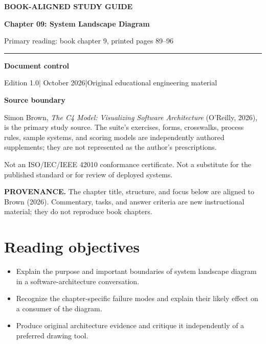 \documentclass[10pt,letterpaper]{article}
\newcommand{\SourceNote}[1]{\par\smallskip\noindent\colorbox{C4Light}{\parbox{0.94\linewidth}{\footnotesize\textbf{PROVENANCE.} #1}}\par\medskip}
\newcommand{\DocStart}[3]{%
\begin{document}
\begin{titlepage}
\renewcommand{\thepage}{title-\arabic{page}}
\vspace*{0.55in}
{\sffamily\bfseries\small\color{C4Teal}#1}\par\vspace{0.24in}
{\sffamily\bfseries\fontsize{26}{31}\selectfont\color{C4Navy}#2}\par\vspace{0.18in}
{\large\color{C4Gray}#3}\par\vspace{0.4in}
\textcolor{C4Teal}{\rule{\linewidth}{1.15pt}}\par\vspace{0.24in}
\textbf{Document control}\par
Edition 1.0\quad|\quad 30 October 2026\quad|\quad Original educational engineering material\par
\vspace{0.17in}
\textbf{Source boundary}\par
Simon Brown, \emph{The C4 Model: Visualizing Software Architecture} (O'Reilly, 2026), is the primary study source. The suite's exercises, forms, crosswalks, process rules, sample systems, and scoring models are independently authored supplements; they are not represented as the author's prescriptions.\par
\vfill
{\small\color{C4Gray}Not an ISO/IEC/IEEE 42010 conformance certificate. Not a substitute for the published standard or for review of deployed systems.}\par
\end{titlepage}
}
\DocStart{BOOK-ALIGNED STUDY GUIDE}{Chapter 09: System Landscape Diagram}{Primary reading: book chapter 9, printed pages 89–96}
\SourceNote{The chapter title, structure, and focus below are aligned to Brown (2026). Commentary, tasks, and answer criteria are new instructional material; they do not reproduce book chapters.}
\section{Reading objectives}
\begin{itemize}
\item Explain the purpose and important boundaries of system landscape diagram in a software-architecture conversation.
\item Recognize the chapter-specific failure modes and explain their likely effect on a consumer of the diagram.
\item Produce original architecture evidence and critique it independently of a preferred drawing tool.
\end{itemize}
\end{document}
